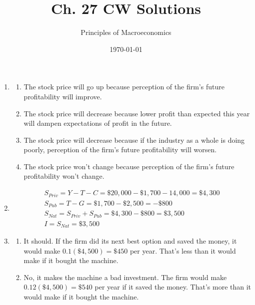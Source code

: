 \documentclass{article}
\title{Ch. 27 CW Solutions}
\author{Principles of Macroeconomics}
\date{\today}
\begin{document}
\maketitle

\begin{enumerate}

\item

	\begin{enumerate}
	
	\item The stock price will go up because perception of the firm's future profitability will improve.
	
	\item The stock price will decrease because lower profit than expected this year will dampen expectations of profit in the future.
	
	\item The stock price will decrease because if the industry as a whole is doing poorly, perception of the firm's future profitability will worsen. 
	
	\item The stock price won't change because perception of the firm's future profitability won't change.
	
	\end{enumerate}
	
\item
	\begin{gather*}
	S_{Priv} = Y - T - C = \$20,000 - \$1,700 - 14,000 = \$4,300 \\
	S_{Pub} = T - G = \$1,700 - \$2,500 = -\$800 \\
	S_{Nat} = S_{Priv} + S_{Pub} = \$4,300 - \$800 = \$3,500 \\
	I = S_{Nat} = \$3,500
	\end{gather*}
	
\item

	\begin{enumerate}
	
	\item It should. If the firm did its next best option and saved the money, it would make $0.1(\$4,500) = \$450$ per year. That's less than it would make if it bought the machine. 
	
	\item No, it makes the machine a bad investment. The firm would make $0.12(\$4,500) = \$540$ per year if it saved the money. That's more than it would make if it bought the machine.
	

\end{enumerate}
\end{enumerate}
\end{document}
